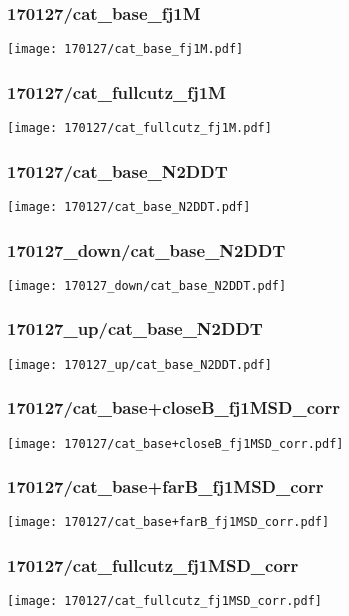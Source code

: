 \begin{frame}
   \frametitle{\small 170127/cat\_base\_fj1M}
   \centering
   \texttt{[image: 170127/cat\_base\_fj1M.pdf]}
\end{frame}

\begin{frame}
   \frametitle{\small 170127/cat\_fullcutz\_fj1M}
   \centering
   \texttt{[image: 170127/cat\_fullcutz\_fj1M.pdf]}
\end{frame}

\begin{frame}
   \frametitle{\small 170127/cat\_base\_N2DDT}
   \centering
   \texttt{[image: 170127/cat\_base\_N2DDT.pdf]}
\end{frame}

\begin{frame}
   \frametitle{\small 170127\_down/cat\_base\_N2DDT}
   \centering
   \texttt{[image: 170127\_down/cat\_base\_N2DDT.pdf]}
\end{frame}

\begin{frame}
   \frametitle{\small 170127\_up/cat\_base\_N2DDT}
   \centering
   \texttt{[image: 170127\_up/cat\_base\_N2DDT.pdf]}
\end{frame}

\begin{frame}
   \frametitle{\small 170127/cat\_base+closeB\_fj1MSD\_corr}
   \centering
   \texttt{[image: 170127/cat\_base+closeB\_fj1MSD\_corr.pdf]}
\end{frame}

\begin{frame}
   \frametitle{\small 170127/cat\_base+farB\_fj1MSD\_corr}
   \centering
   \texttt{[image: 170127/cat\_base+farB\_fj1MSD\_corr.pdf]}
\end{frame}

\begin{frame}
   \frametitle{\small 170127/cat\_fullcutz\_fj1MSD\_corr}
   \centering
   \texttt{[image: 170127/cat\_fullcutz\_fj1MSD\_corr.pdf]}
\end{frame}

